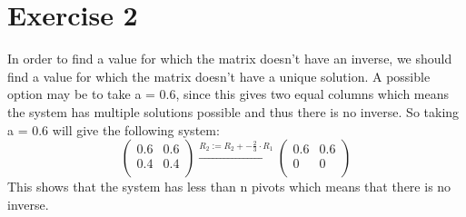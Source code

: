\documentclass[a4paper]{article}
\begin{document}
\section*{Exercise 2}
In order to find a value for which the matrix doesn't have an inverse, we should find a value for which the matrix doesn't have a unique solution. A possible option may be to take a = 0.6, since this gives two equal columns which means the system has multiple solutions possible and thus there is no inverse. So taking a = 0.6 will give the following system:
\[
\left(
\begin{array}{cc}
0.6 & 0.6 \\
0.4 & 0.4 \\
\end{array}
\right)
\xrightarrow{\text{$R_2 := R_2 + - \frac{2}{3} \cdot R_1$}}
\left(
\begin{array}{cc}
0.6 & 0.6 \\
0 & 0 \\
\end{array}
\right)
\]
This shows that the system has less than n pivots which means that there is no inverse.
\end{document}
